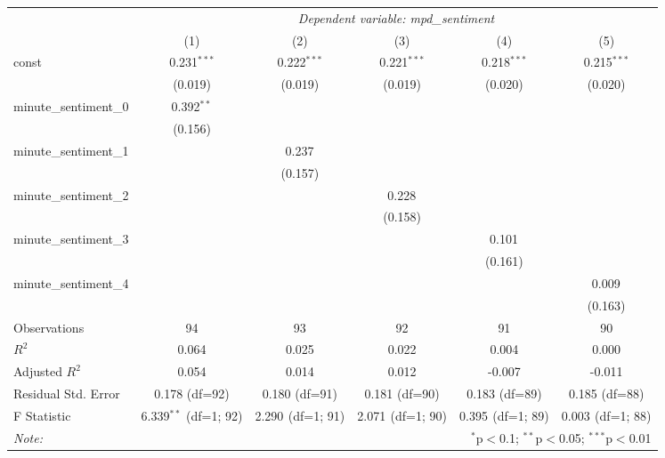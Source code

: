 \documentclass{article}
\begin{document}
\begin{table}[!htbp]
\centering
\begin{adjustbox}{width=\textwidth}
\begin{tabular}{@{}lccccc@{}}
\hline \hline
& \multicolumn{5}{c}{\textit{Dependent variable: mpd\_sentiment}} \\
\cline{2-6}
& (1) & (2) & (3) & (4) & (5) \\
\hline
const & 0.231$^{***}$ & 0.222$^{***}$ & 0.221$^{***}$ & 0.218$^{***}$ & 0.215$^{***}$ \\
& (0.019) & (0.019) & (0.019) & (0.020) & (0.020) \\
minute\_sentiment\_0 & 0.392$^{**}$ & & & & \\
& (0.156) & & & & \\
minute\_sentiment\_1 & & 0.237$^{}$ & & & \\
& & (0.157) & & & \\
minute\_sentiment\_2 & & & 0.228$^{}$ & & \\
& & & (0.158) & & \\
minute\_sentiment\_3 & & & & 0.101$^{}$ & \\
& & & & (0.161) & \\
minute\_sentiment\_4 & & & & & 0.009$^{}$ \\
& & & & & (0.163) \\
\hline
Observations & 94 & 93 & 92 & 91 & 90 \\
$R^2$ & 0.064 & 0.025 & 0.022 & 0.004 & 0.000 \\
Adjusted $R^2$ & 0.054 & 0.014 & 0.012 & -0.007 & -0.011 \\
Residual Std. Error & 0.178 (df=92) & 0.180 (df=91) & 0.181 (df=90) & 0.183 (df=89) & 0.185 (df=88) \\
F Statistic & 6.339$^{**}$ (df=1; 92) & 2.290$^{}$ (df=1; 91) & 2.071$^{}$ (df=1; 90) & 0.395$^{}$ (df=1; 89) & 0.003$^{}$ (df=1; 88) \\
\hline \hline
\textit{Note:} & \multicolumn{5}{r}{$^{*}$p$<$0.1; $^{**}$p$<$0.05; $^{***}$p$<$0.01} \\
\end{tabular}
\end{adjustbox}
\end{table}
\end{document}
